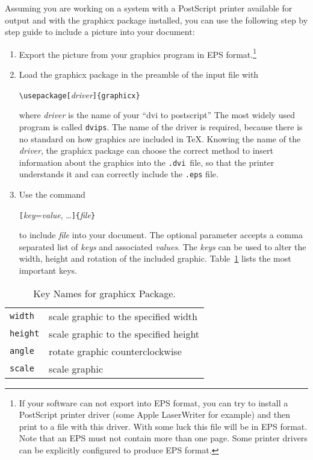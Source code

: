 Assuming you are working on a system with a
PostScript printer available for output and with the \textsf{graphicx}
package installed, you can use the following step by step guide to
include a picture into your document:

\begin{enumerate}
\item Export the picture from your graphics program in EPS
  format.\footnote{If your software can not export into EPS format, you
    can try to install a PostScript printer driver (some Apple
    LaserWriter for example) and then print to a file with this
    driver. With some luck this file will be in EPS format. Note that
    an EPS must not contain more than one page. Some printer drivers
    can be explicitly configured to produce EPS format.}
\item Load the \textsf{graphicx} package in the preamble of the input
  file with
\begin{command}
\verb|\usepackage[|\emph{driver}\verb|]{graphicx}|
\end{command}
where \emph{driver} is the name of your ``dvi to postscript'' The most
widely used program is called \texttt{dvips}. The name of the driver is
required, because there is no standard on how graphics are included in
\TeX{}. Knowing the name of the \emph{driver}, the
\textsf{graphicx} package can choose the correct method to insert
information about the graphics into the \texttt{.dvi}~file, so that the
printer understands it and can correctly include the \texttt{.eps} file.
\item Use the command 
\begin{command}
\verb|[|\emph{key}=\emph{value}, \ldots\verb|]{|\emph{file}\verb|}|
\end{command}
to include \emph{file} into your document. The optional parameter
accepts a comma separated list of \emph{keys} and associated
\emph{values}. The \emph{keys} can be used to alter the width, height
and rotation of the included graphic. Table~\ref{keyvals} lists the
most important keys.
\end{enumerate}

\begin{table}[htb]
\caption{Key Names for \textsf{graphicx} Package.}
\label{keyvals}
\begin{lined}{9cm}
\begin{tabular}{@{}ll}
\texttt{width}& scale graphic to the specified width\\
\texttt{height}& scale graphic to the specified height\\
\texttt{angle}& rotate graphic counterclockwise\\
\texttt{scale}& scale graphic \\
\end{tabular}

\bigskip
\end{lined}
\end{table}

